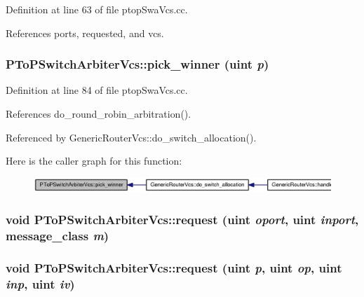 Definition at line 63 of file ptopSwaVcs.cc.

References ports, requested, and vcs.
\subsubsection[{pick\_\-winner}]{ PToPSwitchArbiterVcs::pick\_\-winner ({\bf uint} {\em p})}\label{classPToPSwitchArbiterVcs_39274b4ccaad44c9217f150a30bba0e7}




Definition at line 84 of file ptopSwaVcs.cc.

References do\_\-round\_\-robin\_\-arbitration().

Referenced by GenericRouterVcs::do\_\-switch\_\-allocation().

Here is the caller graph for this function:\nopagebreak
\begin{figure}[H]
\begin{center}
\leavevmode
\includegraphics[width=420pt]{classPToPSwitchArbiterVcs_39274b4ccaad44c9217f150a30bba0e7_icgraph}
\end{center}
\end{figure}
\subsubsection[{request}]{\setlength{\rightskip}{0pt plus 5cm}void PToPSwitchArbiterVcs::request ({\bf uint} {\em oport}, \/  {\bf uint} {\em inport}, \/  {\bf message\_\-class} {\em m})}\label{classPToPSwitchArbiterVcs_1dfd11303e490a337f7c6eec659cedfc}


\subsubsection[{request}]{\setlength{\rightskip}{0pt plus 5cm}void PToPSwitchArbiterVcs::request ({\bf uint} {\em p}, \/  {\bf uint} {\em op}, \/  {\bf uint} {\em inp}, \/  {\bf uint} {\em iv})}\label{classPToPSwitchArbiterVcs_abe8b9b7e2197d9b9b71648c80fb5489}




